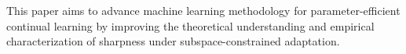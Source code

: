 \documentclass{article}
\theoremstyle{plain}
\theoremstyle{definition}
\theoremstyle{remark}
\begin{document}


This paper aims to advance machine learning methodology for parameter-efficient continual learning by improving the theoretical understanding and empirical characterization of sharpness under subspace-constrained adaptation. 






\newpage
\appendix
\onecolumn



\end{document}
